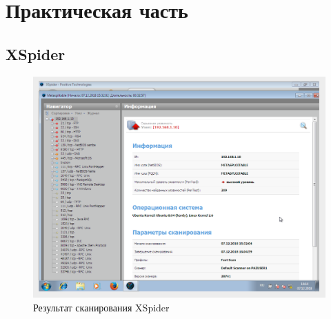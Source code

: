 \section{Практическая часть}

\subsection{XSpider}

\begin{figure}[H]
	\centering
	\caption{Результат сканирования XSpider}
	\includegraphics[width=.9\textwidth]{img/spider-result.png}
\end{figure}

